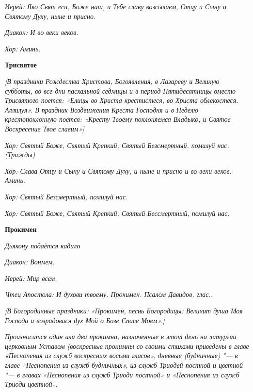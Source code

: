 \itshape Иерей:\normalfont{} Яко Свят еси, Боже наш, и Тебе славу возсылаем, Отцу и Сыну и Святому Духу, ныне и присно.


\itshape Диакон:\normalfont{} И во веки веков.


\itshape Хор:\normalfont{} Аминь.





\bfseries Трисвятое\normalfont{}


\itshape [В праздники Рождества Христова, Богоявления, в Лазареву и Великую субботы, во все дни пасхальной седмицы и в период Пятидесятницы вместо Трисвятого поется: «Елицы во Христа крестистеся, во Христа облекостеся. Аллилуя». В праздник Воздвижения Креста Господня и в Неделю крестопоклонную поется: «Кресту Твоему поклоняемся Владыко, и Святое Воскресение Твое славим»]\normalfont{}


\itshape Хор:\normalfont{} Святый Боже, Святый Крепкий, Святый Безсмертный, помилуй нас. \itshape (Трижды)\normalfont{}


\itshape Хор:\normalfont{} Слава Отцу и Сыну и Святому Духу, и ныне и присно и во веки веков. Аминь.


\itshape Хор:\normalfont{} Святый Безсмертный, помилуй нас.


\itshape Хор:\normalfont{} Святый Боже, Святый Крепкий, Святый Бессмертный, помилуй нас.





\bfseries Прокимен\normalfont{}


\itshape Дьякону подаётся кадило\normalfont{}


\itshape Диакон:\normalfont{} Вонмем.


\itshape Иерей:\normalfont{} Мир всем.


\itshape Чтец Апостола:\normalfont{} И духови твоему. Прокимен. Псалом Давидов, глас..


\itshape [В Богородичные праздники: «Прокимен, песнь Богородицы: Величит душа Моя Господа и возрадовася дух Мой о Бозе Спасе Моем».]\normalfont{}


\itshape Произносится один или два прокимна, назначенные в этот день на литургии церковным Уставом (воскресные прокимны со своими стихами приведены в главе «Песнопения из служб воскресных восьми гласов», дневные (будничные) "--- в главе «Песнопения из служб будничных», из служб Триодей постной и цветной "--- в главах «Песнопения из служб Триоди постной» и «Песнопения из служб Триоди цветной».\normalfont{}


